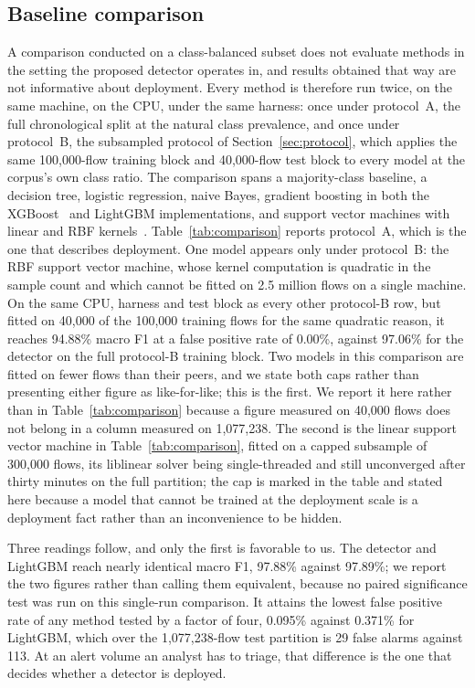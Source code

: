 \documentclass{ieeeaccess}
\begin{document}
\subsection{Baseline comparison}
\label{sec:baselines}
A comparison conducted on a class-balanced subset does not evaluate methods in
the setting the proposed detector operates in, and results obtained that way
are not informative about deployment. Every method is therefore run twice, on
the same machine, on the CPU, under the same harness: once under protocol~A, the
full chronological split at the natural class prevalence, and once under
protocol~B, the subsampled protocol of Section~\ref{sec:protocol}, which applies
the same 100,000-flow training block and 40,000-flow test block to every model at
the corpus's own class ratio. The comparison spans a majority-class baseline, a
decision tree, logistic regression, naive Bayes, gradient boosting in both the
XGBoost~\cite{chen2016xgboost} and LightGBM implementations, and support vector
machines with linear and RBF kernels~\cite{cortes1995svm}.
Table~\ref{tab:comparison} reports protocol~A, which is the one that describes
deployment. One model appears only under protocol~B: the RBF support vector
machine, whose kernel computation is quadratic in the sample count and which
cannot be fitted on 2.5 million flows on a single machine. On the same CPU,
harness and test block as every other protocol-B row, but fitted on 40,000 of the
100,000 training flows for the same quadratic reason, it reaches 94.88\% macro F1
at a false positive rate of 0.00\%, against 97.06\% for the detector on the full
protocol-B training block. Two models in this comparison are fitted on fewer
flows than their peers, and we state both caps rather than presenting either
figure as like-for-like; this is the first. We report it here rather than in
Table~\ref{tab:comparison}
because a figure measured on 40,000 flows does not belong in a column measured on
1,077,238. The second is the linear support vector machine in
Table~\ref{tab:comparison}, fitted on a capped subsample of 300,000 flows, its
liblinear solver being single-threaded and still unconverged after thirty minutes
on the full partition; the cap is marked in the table and stated here because a
model that cannot be trained at the deployment scale is a deployment fact rather
than an inconvenience to be hidden.

Three readings follow, and only the first is favorable to us. The detector and
LightGBM reach nearly identical macro F1, 97.88\% against 97.89\%; we report the
two figures rather than calling them equivalent, because no paired significance
test was run on this single-run comparison. It attains the lowest false positive rate of any
method tested by a factor of four, 0.095\% against 0.371\% for LightGBM, which
over the 1,077,238-flow test partition is 29 false alarms against 113. At an
alert volume an analyst has to triage, that difference is the one that decides
whether a detector is deployed.
\end{document}
